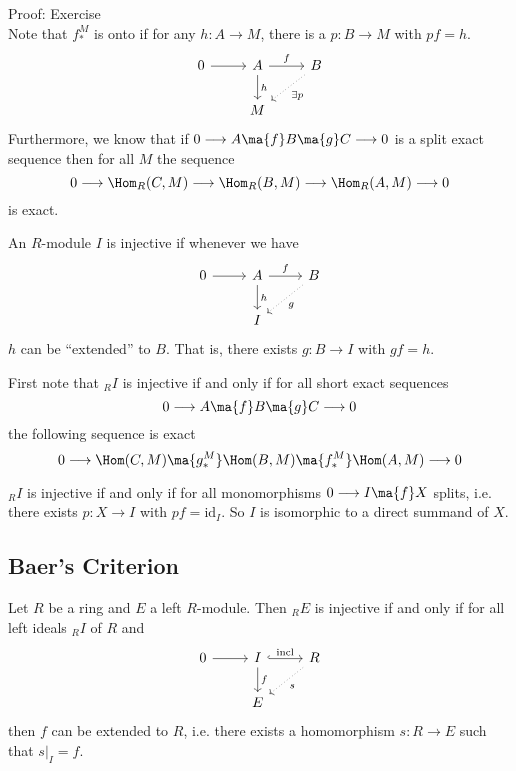 Proof: Exercise \\


Note that $f_*^M$ is onto if for any $h: A \rightarrow M$, there is a $p: B \rightarrow M$ with $pf=h$. 
\[
\begin{tikzcd}
0 \arrow{r} & A \arrow{r}{f} \arrow{d}{h} & B \arrow[dotted]{dl}{\exists p}\\
 & M & 
\end{tikzcd}
\]
Furthermore, we know that if $0 \longrightarrow A \ma{f} B \ma{g} C \longrightarrow 0$ is a split exact sequence then for all $M$ the sequence 
\[
0 \longrightarrow \Hom_R(C,M) \longrightarrow \Hom_R(B,M) \longrightarrow \Hom_R(A,M) \longrightarrow 0
\]
is exact. 

\begin{dfn}
An $R$-module $I$ is injective if whenever we have
\[
\begin{tikzcd}
0 \arrow{r} & A \arrow{r}{f} \arrow{d}{h} & B \arrow[dotted]{dl}{g} \\
& I & 
\end{tikzcd}
\]
$h$ can be ``extended'' to $B$. That is, there exists $g: B \rightarrow I$ with $gf=h$. 
\end{dfn}

First note that $_R I$ is injective if and only if for all short exact sequences
\[
0 \longrightarrow A \ma{f} B \ma{g} C \longrightarrow 0
\]
the following sequence is exact
\[
0 \longrightarrow \Hom(C,M) \ma{g_*^M} \Hom(B,M) \ma{f_*^M} \Hom(A,M) \longrightarrow 0
\]

\begin{prop}
$_R I$ is injective if and only if for all monomorphisms $0 \longrightarrow I \ma{f} X$ splits, i.e. there exists $p: X \rightarrow I$ with $pf=\text{id}_I$. So $I$ is isomorphic to a direct summand of $X$.
\end{prop}


\subsection{Baer's Criterion} 


\begin{thm}
Let $R$ be a ring and $E$ a left $R$-module. Then $_R E$ is injective if and only if for all left ideals $_R I$ of $R$ and 
\[
\begin{tikzcd}
0 \arrow{r} & I \arrow[hook]{r}{\text{incl}} \arrow{d}{f} & R \arrow[dotted]{dl}{s} \\
& E & 
\end{tikzcd}
\]
then $f$ can be extended to $R$, i.e. there exists a homomorphism $s: R \rightarrow E$ such that $s|_I=f$. 
\end{thm}

